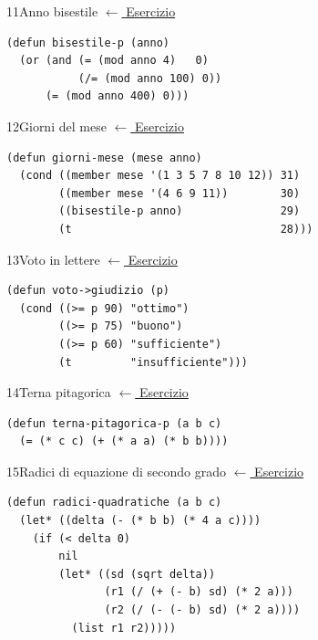 \label{sol:11}
\begin{solbox}{11}{Anno bisestile}
\small\color{black!55}\hyperref[ex:11]{$\leftarrow$ Esercizio}\normalsize\color{black}
\begin{lstlisting}
(defun bisestile-p (anno)
  (or (and (= (mod anno 4)   0)
           (/= (mod anno 100) 0))
      (= (mod anno 400) 0)))
\end{lstlisting}
\end{solbox}

\label{sol:12}
\begin{solbox}{12}{Giorni del mese}
\small\color{black!55}\hyperref[ex:12]{$\leftarrow$ Esercizio}\normalsize\color{black}
\begin{lstlisting}
(defun giorni-mese (mese anno)
  (cond ((member mese '(1 3 5 7 8 10 12)) 31)
        ((member mese '(4 6 9 11))        30)
        ((bisestile-p anno)               29)
        (t                                28)))
\end{lstlisting}
\end{solbox}

\label{sol:13}
\begin{solbox}{13}{Voto in lettere}
\small\color{black!55}\hyperref[ex:13]{$\leftarrow$ Esercizio}\normalsize\color{black}
\begin{lstlisting}
(defun voto->giudizio (p)
  (cond ((>= p 90) "ottimo")
        ((>= p 75) "buono")
        ((>= p 60) "sufficiente")
        (t         "insufficiente")))
\end{lstlisting}
\end{solbox}

\label{sol:14}
\begin{solbox}{14}{Terna pitagorica}
\small\color{black!55}\hyperref[ex:14]{$\leftarrow$ Esercizio}\normalsize\color{black}
\begin{lstlisting}
(defun terna-pitagorica-p (a b c)
  (= (* c c) (+ (* a a) (* b b))))
\end{lstlisting}
\end{solbox}

\label{sol:15}
\begin{solbox}{15}{Radici di equazione di secondo grado}
\small\color{black!55}\hyperref[ex:15]{$\leftarrow$ Esercizio}\normalsize\color{black}
\begin{lstlisting}
(defun radici-quadratiche (a b c)
  (let* ((delta (- (* b b) (* 4 a c))))
    (if (< delta 0)
        nil
        (let* ((sd (sqrt delta))
               (r1 (/ (+ (- b) sd) (* 2 a)))
               (r2 (/ (- (- b) sd) (* 2 a))))
          (list r1 r2)))))
\end{lstlisting}
\end{solbox}

